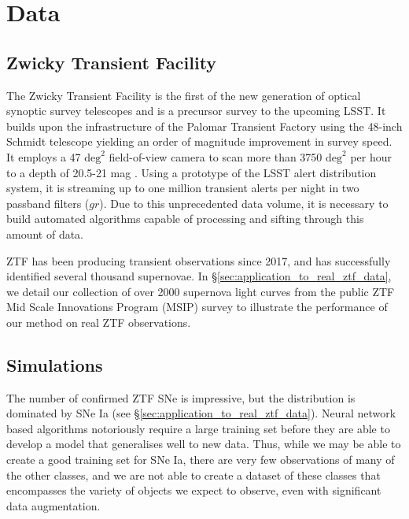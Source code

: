 \documentclass[fleqn,usenatbib]{mnras}
\begin{document}
\section{Data}
\label{sec:Data}

\subsection{Zwicky Transient Facility}
The Zwicky Transient Facility \citep[ZTF, ][]{Bellm2019ZTF} is the first of the new generation of optical synoptic survey telescopes and is a precursor survey to the upcoming LSST. It builds upon the infrastructure of the Palomar Transient Factory \citep[PTF, ][]{PTFrau2009} using the 48-inch Schmidt telescope yielding an order of magnitude improvement in survey speed. It employs a 47 $\mathrm{deg}^2$ field-of-view camera to scan more than 3750 $\mathrm{deg}^2$ per hour to a depth of 20.5-21 mag \citep{GrahamZTF2019PASP}. Using a prototype of the LSST alert distribution system, it is streaming up to one million transient alerts per night in two passband filters ($gr$). Due to this unprecedented data volume, it is necessary to build automated algorithms capable of processing and sifting through this amount of data. 

ZTF has been producing transient observations since 2017, and has successfully identified several thousand supernovae. In \S\ref{sec:application_to_real_ztf_data}, we detail our collection of over 2000 supernova light curves from the public ZTF Mid Scale Innovations Program (MSIP) survey to illustrate the performance of our method on real ZTF observations. 


\subsection{Simulations}
The number of confirmed ZTF SNe is impressive, but the distribution is dominated by SNe Ia (see \S\ref{sec:application_to_real_ztf_data}). Neural network based algorithms notoriously require a large training set before they are able to develop a model that generalises well to new data. Thus, while we may be able to create a good training set for SNe Ia, there are very few observations of many of the other classes, and we are not able to create a dataset of these classes that encompasses the variety of objects we expect to observe, even with significant data augmentation.
\end{document}
